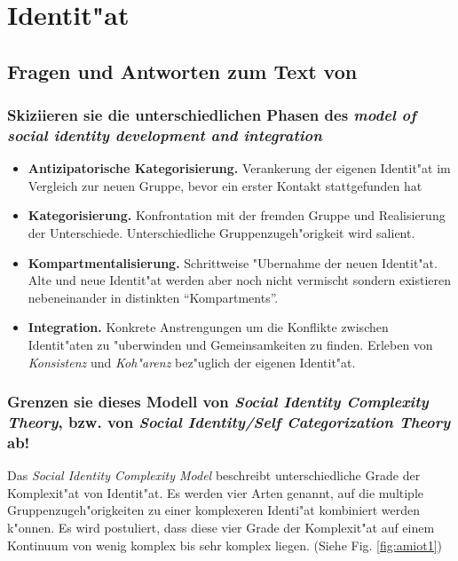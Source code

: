 \section{Identit"at}
\subsection{Fragen und Antworten zum Text von \textcite{amiot_facilitating_2010}}
\subsubsection{Skiziieren sie die unterschiedlichen Phasen des \emph{model of social identity development and integration} \parencite{amiot_facilitating_2010}}
\begin{itemize}
        \item \textbf{Antizipatorische Kategorisierung.} Verankerung der eigenen Identit"at im Vergleich zur neuen Gruppe, bevor ein erster Kontakt stattgefunden hat
        \item \textbf{Kategorisierung.} Konfrontation mit der fremden Gruppe und Realisierung der Unterschiede. Unterschiedliche Gruppenzugeh"origkeit wird salient.
        \item \textbf{Kompartmentalisierung.} Schrittweise "Ubernahme der neuen Identit"at. Alte und neue Identit"at werden aber noch nicht vermischt sondern existieren nebeneinander in distinkten ``Kompartments''.
        \item \textbf{Integration.} Konkrete Anstrengungen um die Konflikte zwischen Identit"aten zu "uberwinden und Gemeinsamkeiten zu finden. Erleben von \emph{Konsistenz} und \emph{Koh"arenz} bez"uglich der eigenen Identit"at.
\end{itemize}

\subsubsection{Grenzen sie dieses Modell von \emph{Social Identity Complexity Theory}, bzw. von \emph{Social Identity/Self Categorization Theory} ab!}

Das \emph{Social Identity Complexity Model} \parencite{brewer_social_2010} beschreibt unterschiedliche Grade der Komplexit"at von Identit"at. Es werden vier Arten genannt, auf die multiple Gruppenzugeh"origkeiten zu einer komplexeren Identi"at kombiniert werden k"onnen. Es wird postuliert, dass diese vier Grade der Komplexit"at auf einem Kontinuum von wenig komplex bis sehr komplex liegen. (Siehe Fig. \ref{fig:amiot1})

